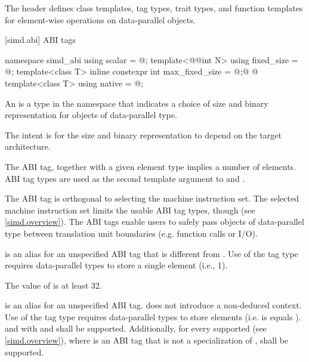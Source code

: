 \pnum
The header  defines class templates, tag types, trait types, and function templates for element-wise operations on data-parallel objects.

[simd.abi]{ ABI tags}

\begin{codeblock}
namespace simd_abi {
  using scalar = @\seebelow@;
  template<@@int N> using fixed_size = @\seebelow@;
  template<class T> inline constexpr int max_fixed_size = @\impdef@;@
  @
  template<class T> using native = @\impdef@;
}
\end{codeblock}

\pnum
An  is a type in the  namespace that indicates a choice of size and binary representation for objects of data-parallel type. \begin{note}The intent is for the size and binary representation to depend on the target architecture.\end{note} The ABI tag, together with a given element type implies a number of elements. ABI tag types are used as the second template argument to  and .

\pnum
\begin{note}The ABI tag is orthogonal to selecting the machine instruction set. The selected machine instruction set limits the usable ABI tag types, though (see \ref{simd.overview}). The ABI tags enable users to safely pass objects of data-parallel type between translation unit boundaries (e.g. function calls or I/O).\end{note}

\pnum
{} is an alias for an unspecified ABI tag that is different from .
Use of the  tag type requires data-parallel types to store a single element (i.e.,  1).

\pnum
The value of  is at least 32.

\pnum
{} is an alias for an unspecified ABI tag.
 does not introduce a non-deduced context.
Use of the  tag type requires data-parallel types to store 
elements (i.e.
\wgChange
  { is}
  { equals}
).  and  with  and  shall be supported.
Additionally, for every supported  (see \ref{simd.overview}), where 
is an ABI tag that is not a specialization of ,  shall be supported.

